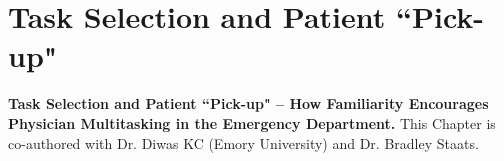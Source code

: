 \chapter{Task Selection and Patient “Pick-up"} 

    \textbf{Task Selection and Patient “Pick-up" -- How Familiarity Encourages Physician Multitasking in the Emergency Department.}
    This Chapter is co-authored with Dr. Diwas KC (Emory University) and Dr. Bradley Staats.


